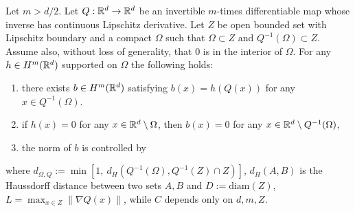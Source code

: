 \begin{theorem}\label{thm:sobolev-smooth-composition}
 Let $m > d/2$. Let $Q:\mathbb R^d \to \mathbb R^d$ be an invertible $m$-times differentiable map whose inverse has continuous Lipschitz derivative. Let $Z$ be open bounded set with Lipschitz boundary and a compact $\Omega$ such that $\Omega \subset Z$ and $Q^{-1}(\Omega)\subset Z$. Assume also, without loss of generality, that $0$ is in the interior of $\Omega$. For any $h \in H^m(\mathbb R^d)$ supported on $\Omega$ the following holds:
 \begin{enumerate}
     \item there exists $b \in H^m(\mathbb R^d)$ satisfying $b(x) = h(Q(x))$ for any $x \in Q^{-1}(\Omega)$.
     \item if $h(x) = 0$ for any $x \in \mathbb R^d\setminus \Omega$, then $b(x) = 0$ for any $x \in \mathbb R^d \setminus Q^{-1}(\Omega)$,
     \item the norm of $b$ is controlled by
\end{enumerate}
where $d_{\Omega,Q} := \min[1,~d_H(Q^{-1}(\Omega), Q^{-1}(Z) \cap Z)]$, $d_H(A,B)$ is the Haussdorff distance between two sets $A, B$ and $D := \textrm{diam}(Z)$, $L = \max_{x \in Z} \|\nabla Q (x)\|$, while $C$ depends only on $d, m, Z$.
\end{theorem}
